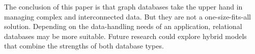 The conclusion of this paper is that graph databases take the upper hand in managing complex and interconnected data. But they are not a one-size-fits-all solution. Depending on the data-handling needs of an application, relational databases may be more suitable. Future research could explore hybrid models that combine the strengths of both database types. 





